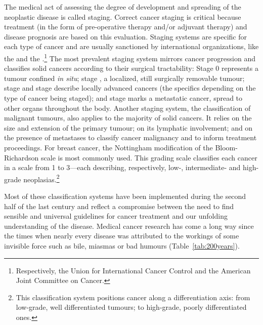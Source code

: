 The medical act of assessing the degree of development and spreading of the
neoplastic disease is called staging.  Correct cancer staging is critical
because treatment (in the form of pre-operative therapy and/or adjuvant therapy)
and disease prognosis are based on this evaluation.  Staging systems are
specific for each type of cancer and are usually sanctioned by international
organizations, like the  and the
.\footnote{Respectively, the Union for International Cancer
  Control and the American Joint Committee on Cancer.}  The most prevalent
staging system mirrors cancer progression and classifies solid cancers according
to their surgical tractability: Stage 0 represents a tumour confined \emph{in
  situ}; stage , a localized, still surgically removable tumour;
stage  and stage  describe locally advanced cancers
(the specifics depending on the type of cancer being staged); and stage
 marks a metastatic cancer, spread to other organs throughout the
body.\cite{greene_ajcc_2002} Another staging system, the 
classification of malignant tumours, also applies to the majority of solid
cancers. It relies on the size and extension of the primary tumour; on its
lymphatic involvement; and on the presence of metastases to classify cancer
malignancy and to inform treatment proceedings.\cite{denoix_enquete_1946} For
breast cancer, the Nottingham modification of the Bloom-Richardson scale is most
commonly used. This grading scale classifies each cancer in a scale from 1 to
3---each describing, respectively, low-, intermediate- and high-grade
neoplasias.\footnote{This classification system positions cancer along a
  differentiation axis: from low-grade, well differentiated tumours; to
  high-grade, poorly differentiated ones.}

Most of these classification systems have been implemented during the second
half of the last century and reflect a compromise between the need to find
sensible and universal guidelines for cancer treatment and our unfolding
understanding of the disease.  Medical cancer research has come a long way since
the times when nearly every disease was attributed to the workings of some
invisible force such as bile, miasmas or bad humours (Table~\ref{tab:200years}).

